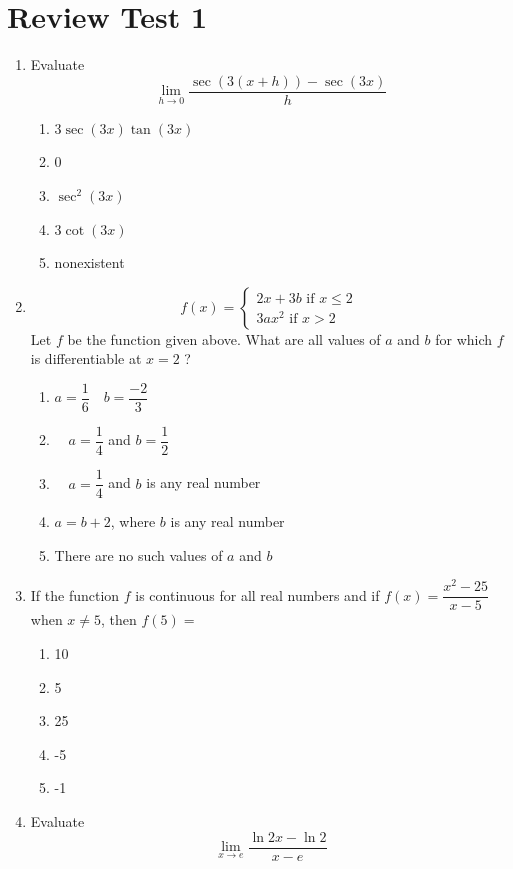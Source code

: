 \documentclass[12pt
]{article}
\author{}
\date{}
\providecommand{\tightlist}{%
  \setlength{\itemsep}{0pt}\setlength{\parskip}{0pt}}
\let\oldsection\section
\renewcommand{\section}[1]{\clearpage\oldsection{#1}}
\def\tightlist{}
\begin{document}
\section{Review Test 1}\label{review-test-1}

\begin{enumerate}
\def\labelenumi{\arabic{enumi}.}
\item
  Evaluate
  \[\lim_{h \rightarrow 0}\dfrac{\sec(3(x + h)) - \sec(3x)}{h}\]

  \begin{enumerate}
  \def\labelenumii{\alph{enumii}.}
  \setcounter{enumii}{1}
  \tightlist
  \item
    \(3\sec(3x)\tan(3x)\)
  \item
    0
  \item
    \(\sec^{2}(3x)\)
  \item
    \(3\cot(3x)\)
  \item
    nonexistent
  \end{enumerate}
\item
  \[f(x) = \left\{ \begin{matrix}
  2x + 3b\text{ if }x \leq 2 \\
  3ax^{2}\text{ if }x > 2
  \end{matrix} \right.\ \] Let \(f\) be the function given above. What
  are all values of \(a\) and \(b\) for which \(f\) is differentiable at
  \(x = 2\) ?

  \begin{enumerate}
  \def\labelenumii{\alph{enumii}.}
  \tightlist
  \item
    \(a = \dfrac{1}{6} \quad b = \dfrac{-2}{3}\)
  \item
    \(\quad a = \dfrac{1}{4}\) and \(b = \dfrac{1}{2}\)
  \item
    \(\quad a = \dfrac{1}{4}\) and \(b\) is any real number
  \item
    \(a = b + 2\), where \(b\) is any real number
  \item
    There are no such values of \(a\) and \(b\)
  \end{enumerate}
\item
  If the function \(f\) is continuous for all real numbers and if
  \(f(x) = \dfrac{x^{2} - 25}{x - 5}\) when \(x \neq 5\), then
  \(f( 5 ) =\)

  \begin{enumerate}
  \def\labelenumii{\alph{enumii}.}
  \tightlist
  \item
    10
  \item
    5
  \item
    25
  \item
    -5
  \item
    -1
  \end{enumerate}
\item
  Evaluate \[\lim_{x \rightarrow e}\dfrac{\ln 2x - \ln 2}{x - e}\]


\end{enumerate}
\end{document}
